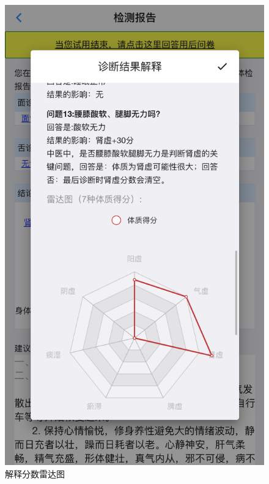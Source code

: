\begin{figure}
    \centering
    \includegraphics{images/report8.png}
    \caption{解释分数雷达图}
    \label{fig:report_expalin_score_2}
\end{figure}

